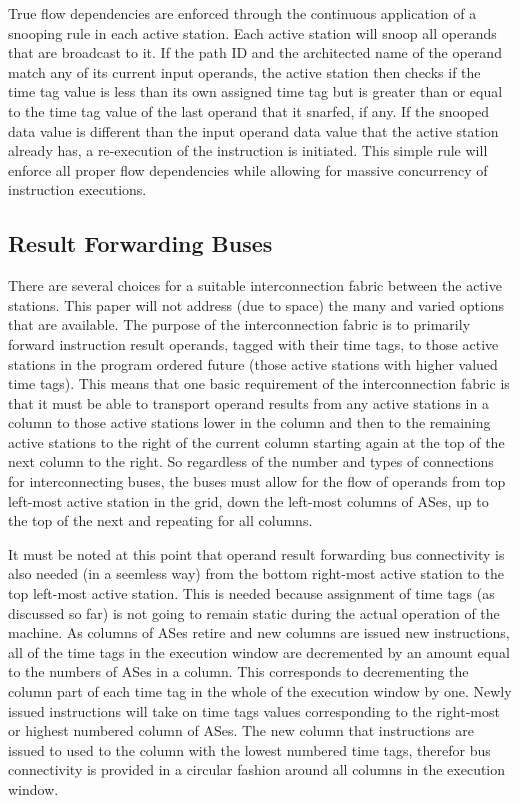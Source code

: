 \documentclass[10pt,dvips]{article}
\begin{document}
True flow dependencies are enforced through the continuous application of 
a snooping rule in each active station.  Each active station
will snoop all operands that are broadcast to it.  If the
path ID and the architected name of the operand match any of
its current input operands, the active station then checks
if the time tag value is less than its own assigned time tag
but is greater than or equal to the time tag value of the last
operand that it snarfed, if any.  If the snooped data value is
different than the input operand data value that the active
station already has, a re-execution of the instruction is initiated.
This simple rule will enforce
all proper flow dependencies while allowing for massive
concurrency of instruction executions.

\subsection{Result Forwarding Buses}
There are several choices for a suitable interconnection fabric between
the active stations.  This paper will not address (due to space) the
many and varied options that are available.  The purpose of the
interconnection fabric is to primarily forward instruction result
operands, tagged with their time tags, 
to those active stations in the program ordered future (those
active stations with higher valued time tags).  This means that one
basic requirement of the interconnection fabric is that it must be able
to transport operand results from any active stations in a column to
those active stations lower in the column and then to the remaining
active stations to the right of the current column starting again at
the top of the next column to the right.  So regardless of the number
and types of connections for interconnecting buses, the buses must
allow for the flow of operands from top left-most active station in the
grid, down the left-most columns of ASes, up to the top of the next and
repeating for all columns.

It must be noted at this point that operand result forwarding
bus connectivity is also needed (in a seemless way) from the bottom
right-most active station to the top left-most active station.
This is needed because assignment of time tags (as discussed so far)
is not going to remain static during the actual operation of the machine.
As columns of ASes retire and new columns are issued new instructions,
all of the time tags in the execution window are decremented by
an amount equal to the numbers of ASes in a column.  This corresponds
to decrementing the column part of each time tag in the whole of the
execution window by one.  Newly issued instructions will take on
time tags values corresponding to the right-most or highest numbered
column of ASes.  The new column that instructions are issued to used
to the column with the lowest numbered time tags, therefor bus
connectivity is provided in a circular fashion around all columns
in the execution window.
\end{document}
